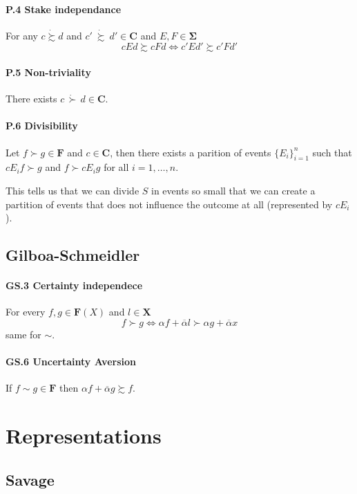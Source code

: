 \documentclass[14pt]{extarticle}
\newcommand{\dsuccsim}{\ \dot \succsim \ }
\begin{document}
\paragraph{P.4 Stake independance}
For any $c \dot \succsim d$ and $c' \dsuccsim d' \in \bm C$
and $E, F \in \bm \Sigma$
\[
	cEd \succsim cFd \iff c'Ed'\succsim c'Fd'
\]

\paragraph{P.5 Non-triviality}
There exists $c \, \dot \succ \, d \in \bm C$.

\paragraph{P.6 Divisibility}
Let $f \succ g \in \bm F$ and $c \in \bm C$,
then there exists a parition of events $\{E_i\}^n_{i=1}$
such that $cE_if \succ g$ and $f \succ cE_ig$ for all $i=1,\dots,n$.

This tells us that we can divide $S$ in events so small that we can create
a partition of events that does not influence the outcome at all (represented by $cE_i$).

\subsection{Gilboa-Schmeidler}
\paragraph{GS.3 Certainty independece}
For every $f, g \in \bm F(X)$ and $l \in \bm X$
\[
	f \succ g \iff \alpha f + \overline \alpha l \succ \alpha g + \overline \alpha x
\]
same for $\sim$.

\paragraph{GS.6 Uncertainty Aversion}
If $f \sim g \in \bm F$ then $\alpha f + \overline \alpha g \succsim f$.

%

\section{Representations}

\subsection{Savage}
\end{document}
